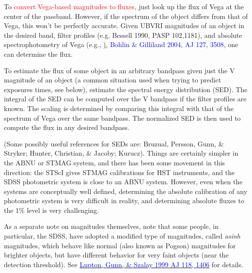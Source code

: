 \documentclass[12pt]{article}
\begin{document}
To \textcolor{red}{convert Vega-based magnitudes to fluxes},
just look up the flux of Vega at the center of the passband.
However, if the spectrum of the object
differs from that of Vega, this won't be perfectly accurate.
Given UBVRI magnitudes of an object in the desired band, filter profiles
(e.g. Bessell 1990, PASP 102,1181), and absolute spectrophotometry of
Vega (e.g., \href{http://adsabs.harvard.edu/abs/2004AJ....127.3508B}),
{\textcolor{blue}{Bohlin \& Gilliland 2004, AJ 127, 3508}},
one can determine the flux.

To estimate the flux of some object in
an arbitrary bandpass given just the V magnitude of an object (a common
situation used when trying to predict exposures times, see below),
estimate the spectral energy distribution (SED).
The integral of the SED can be computed over the V bandpass if the
filter profiles are known.
The scaling is determined by comparing this integral with that of
the spectrum of Vega over the same bandpass.
The normalized SED is then used to compute the flux in any
desired bandpass.

(Some possibly useful references for SEDs are:
Bruzual, Persson, Gunn, \& Stryker; Hunter, Christian, \& Jacoby;
Kurucz). Things are certainly simpler in the ABNU or STMAG system, and
there has been some movement in this direction: the STScI gives STMAG
calibrations for HST instruments, and the SDSS photometric system is
close to an ABNU system.
However, even when the systems are conceptually
well defined, determining the absolute calibration of any photometric
system is very difficult in reality, and determining absolute fluxes
to the 1\% level is very challenging.

As a separate note on magnitudes themselves, note that some
people, in particular, the SDSS, have adopted a modified type of
magnitudes, called \emph{asinh} magnitudes, which behave like normal (also
known as Pogson) magnitudes for brighter objects, but have different
behavior for very faint objects (near the detection threshold). See
\href{http://adsabs.harvard.edu/abs/1999AJ....118.1406L}
{\textcolor{blue}{Lupton, Gunn, \& Szalay 1999 AJ 118, 1406}}
for details.

\end{document}
